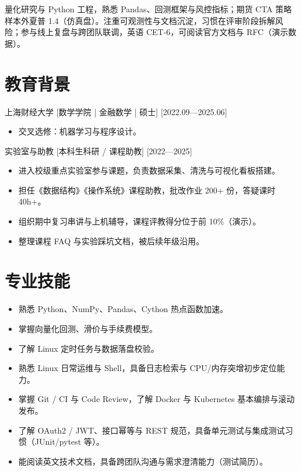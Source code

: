 \documentclass{resume-photo}
\begin{document}

\ResumeTitle

\noindent 量化研究与 Python 工程，熟悉 Pandas、回测框架与风控指标；期货 CTA 策略样本外夏普 1.4（仿真盘）。注重可观测性与文档沉淀，习惯在评审阶段拆解风险；参与线上复盘与跨团队联调，英语 CET-6，可阅读官方文档与 RFC（演示数据）。

\section{教育背景}
\ResumeItem
{上海财经大学}
[\textnormal{数学学院 | 金融数学 | 硕士}]
[2022.09—2025.06]

\begin{itemize}
  \item 交叉选修：机器学习与程序设计。
\end{itemize}


\ResumeItem
{实验室与助教}
[\textnormal{本科生科研 / 课程助教}]
[2022—2025]

\begin{itemize}
  \item 进入校级重点实验室参与课题，负责数据采集、清洗与可视化看板搭建。
  \item 担任《数据结构》《操作系统》课程助教，批改作业 200+ 份，答疑课时 40h+。
  \item 组织期中复习串讲与上机辅导，课程评教得分位于前 10\%（演示）。
  \item 整理课程 FAQ 与实验踩坑文档，被后续年级沿用。
\end{itemize}



\section{专业技能}
\begin{itemize}
  \item 熟悉 Python、NumPy、Pandas、Cython 热点函数加速。
  \item 掌握向量化回测、滑价与手续费模型。
  \item 了解 Linux 定时任务与数据落盘校验。
  \item 熟悉 Linux 日常运维与 Shell，具备日志检索与 CPU/内存突增初步定位能力。
  \item 掌握 Git / CI 与 Code Review，了解 Docker 与 Kubernetes 基本编排与滚动发布。
  \item 了解 OAuth2 / JWT、接口幂等与 REST 规范，具备单元测试与集成测试习惯（JUnit/pytest 等）。
  \item 能阅读英文技术文档，具备跨团队沟通与需求澄清能力（测试简历）。
\end{itemize}
\end{document}
